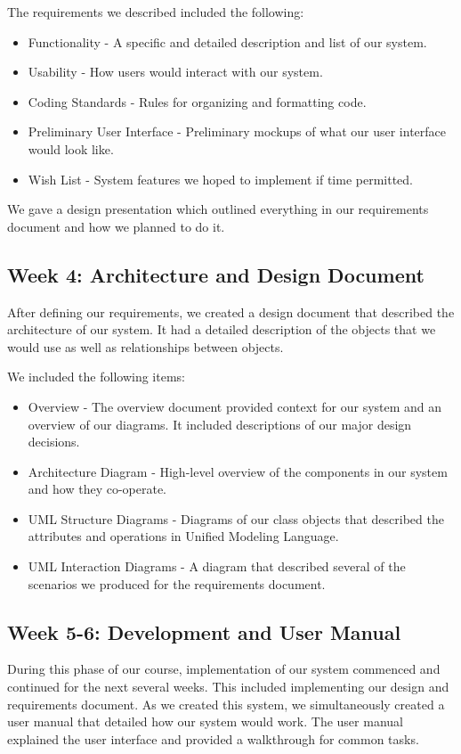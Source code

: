 \documentclass[12pt]{article}
\begin{document}
\begin{enumerate}
\begin{enumerate}
The requirements we described included the following:
\begin{itemize}
\item Functionality - A specific and detailed description and list of our system.
\item Usability - How users would interact with our system.
\item Coding Standards - Rules for organizing and formatting code.
\item Preliminary User Interface - Preliminary mockups of what our user interface would look like. 
\item Wish List - System features we hoped to implement if time permitted.
\end{itemize}

We gave a design presentation which outlined everything in our requirements document and how we planned to do it. 

\subsection*{Week 4: Architecture and Design Document}

After defining our requirements, we created a design document that described the architecture of our system. It had a detailed description of the objects that we would use as well as relationships between objects. 

We included the following items: 
\begin{itemize}
\item Overview - The overview document provided context for our system and an overview of our diagrams. It included descriptions of our major design decisions. 
\item Architecture Diagram - High-level overview of the components in our system and how they co-operate. 
\item UML Structure Diagrams - Diagrams of our class objects that described the attributes and operations in Unified Modeling Language.
\item UML Interaction Diagrams - A diagram that described several of the scenarios we produced for the requirements document. 
\end{itemize}

\subsection*{Week 5-6: Development and User Manual}
During this phase of our course, implementation of our system commenced and continued for the next several weeks. This included implementing our design and requirements document. As we created this system, we simultaneously created a user manual that detailed how our system would work. The user manual explained the user interface  and provided a walkthrough for common tasks.


\end{enumerate}
\end{enumerate}
\end{document}
